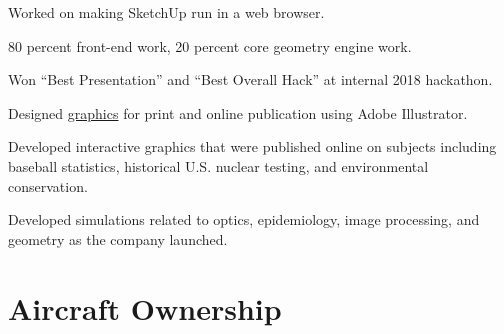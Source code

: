 \documentclass[]{mershon-two-column-resume}
\begin{document}
\begin{minipage}[t]{0.66\textwidth}
		\begin{tightemize}
			\item Worked on making SketchUp run in a web browser.
			\item 80 percent front-end work, 20 percent core geometry engine work. 
			\item Won ``Best Presentation'' and ``Best Overall Hack'' at internal 2018 hackathon.
		\end{tightemize}
		\sectionsep
		
		\begin{tightemize}
			\item Designed \href{https://github.com/bmershon/published-urls}{graphics} for print and online publication using Adobe Illustrator. \item Developed interactive graphics that were published online on subjects including baseball statistics, historical U.S. nuclear testing, and environmental conservation.
		\end{tightemize}
		\sectionsep
		
		\sectionsep
		
		\begin{tightemize}
			\item Developed simulations related to optics, epidemiology, image processing, and geometry as the company launched.
		\end{tightemize}
		\sectionsep
		
		\section{Aircraft Ownership}
		
		\sectionsep
		
		\sectionsep
		
		\sectionsep
		

		\sectionsep
		
	\end{minipage} 
\end{document}
